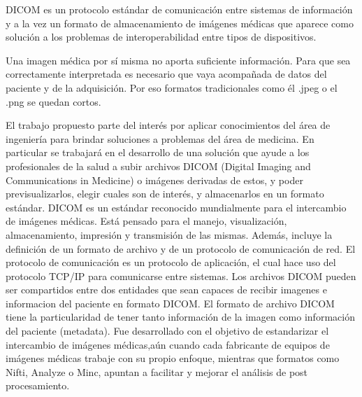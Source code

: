 \documentclass{article}
\begin{document}
DICOM es un protocolo estándar de comunicación entre sistemas de información y a la vez un formato de almacenamiento de imágenes médicas que aparece como solución a los problemas de interoperabilidad entre tipos de dispositivos.

Una imagen médica por sí misma no aporta suficiente información. Para que sea correctamente interpretada es necesario que vaya acompañada de datos del paciente y de la adquisición. Por eso formatos tradicionales como él .jpeg o el .png se quedan cortos.

	El trabajo propuesto parte del interés por aplicar conocimientos del área de ingeniería para brindar soluciones a problemas del área de medicina. En particular
se trabajará en el desarrollo de una solución que ayude a los profesionales de la salud a subir archivos DICOM (Digital Imaging and Communications in Medicine) o imágenes derivadas de estos, y poder previsualizarlos, elegir cuales son de interés, y almacenarlos en un formato estándar.
		DICOM es un estándar reconocido mundialmente para el intercambio de imágenes médicas. Está pensado para el manejo, visualización, almacenamiento, impresión y transmisión de las mismas. Además, incluye la definición de un formato de archivo y de un protocolo de comunicación de red.
		El protocolo de comunicación es un protocolo de aplicación, el cual hace uso del protocolo TCP/IP para comunicarse entre sistemas. Los archivos DICOM
pueden ser compartidos entre dos entidades que sean capaces de recibir imagenes e informacion del paciente en formato DICOM.
		El formato de archivo DICOM tiene la particularidad de tener tanto información de la imagen como información del paciente (metadata). Fue desarrollado con el objetivo de estandarizar el intercambio de imágenes médicas,aún cuando cada fabricante de equipos de imágenes médicas trabaje con su propio enfoque, mientras que formatos como Nifti, Analyze o Minc, apuntan a facilitar y mejorar el análisis de post procesamiento.
\end{document}
